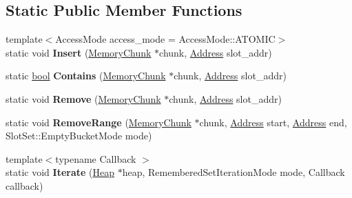 \subsection*{Static Public Member Functions}
\begin{DoxyCompactItemize}
\item 
\mbox{\label{classv8_1_1internal_1_1RememberedSet_a0cede271e87b3c0dfa0a1ff9d08c6ae9}} 
{\footnotesize template$<$Access\+Mode access\+\_\+mode = Access\+Mode\+::\+A\+T\+O\+M\+IC$>$ }\\static void {\bfseries Insert} (\mbox{\hyperlink{classv8_1_1internal_1_1MemoryChunk}{Memory\+Chunk}} $\ast$chunk, \mbox{\hyperlink{classuintptr__t}{Address}} slot\+\_\+addr)
\item 
\mbox{\label{classv8_1_1internal_1_1RememberedSet_ac2389422a9fa1727303b885b57daf2a4}} 
static \mbox{\hyperlink{classbool}{bool}} {\bfseries Contains} (\mbox{\hyperlink{classv8_1_1internal_1_1MemoryChunk}{Memory\+Chunk}} $\ast$chunk, \mbox{\hyperlink{classuintptr__t}{Address}} slot\+\_\+addr)
\item 
\mbox{\label{classv8_1_1internal_1_1RememberedSet_a305d9f1e1b65f8271594317101ec9fc2}} 
static void {\bfseries Remove} (\mbox{\hyperlink{classv8_1_1internal_1_1MemoryChunk}{Memory\+Chunk}} $\ast$chunk, \mbox{\hyperlink{classuintptr__t}{Address}} slot\+\_\+addr)
\item 
\mbox{\label{classv8_1_1internal_1_1RememberedSet_a8a83b8bd95360ba2463ea4f584ed09a9}} 
static void {\bfseries Remove\+Range} (\mbox{\hyperlink{classv8_1_1internal_1_1MemoryChunk}{Memory\+Chunk}} $\ast$chunk, \mbox{\hyperlink{classuintptr__t}{Address}} start, \mbox{\hyperlink{classuintptr__t}{Address}} end, Slot\+Set\+::\+Empty\+Bucket\+Mode mode)
\item 
\mbox{\label{classv8_1_1internal_1_1RememberedSet_abab20db130f4f10a93d7d6c7327f8e69}} 
{\footnotesize template$<$typename Callback $>$ }\\static void {\bfseries Iterate} (\mbox{\hyperlink{classv8_1_1internal_1_1Heap}{Heap}} $\ast$heap, Remembered\+Set\+Iteration\+Mode mode, Callback callback)
\item 

\end{DoxyCompactItemize}
